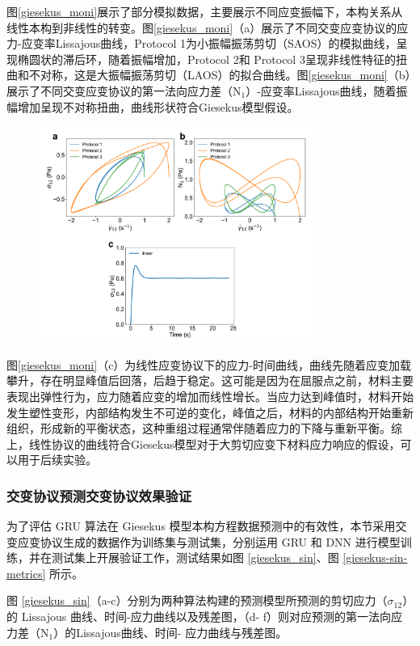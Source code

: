 图\ref{giesekus_moni}展示了部分模拟数据，主要展示不同应变振幅下，本构关系从线性本构到非线性的转变。图\ref{giesekus_moni}（a）展示了不同交变应变协议的应力-应变率Lissajous曲线，Protocol 1为小振幅振荡剪切（SAOS）的模拟曲线，呈现椭圆状的滞后环，随着振幅增加，Protocol 2和 Protocol 3呈现非线性特征的扭曲和不对称，这是大振幅振荡剪切（LAOS）的拟合曲线。图\ref{giesekus_moni}（b）展示了不同交变应变协议的第一法向应力差（N$_1$）-应变率Lissajous曲线，随着振幅增加呈现不对称扭曲，曲线形状符合Giesekus模型假设\cite{lennonScientificMachineLearning2023a}。
\begin{figure}[htbp]
  \centering
  \includegraphics[width=0.8\textwidth]{Fig/giesekus-moni.pdf}
  \FigureBicaption{\label{giesekus_moni}}{}
\end{figure}
图\ref{giesekus_moni}（c）为线性应变协议下的应力-时间曲线，曲线先随着应变加载攀升，存在明显峰值后回落，后趋于稳定。这可能是因为在屈服点之前，材料主要表现出弹性行为，应力随着应变的增加而线性增长。当应力达到峰值时，材料开始发生塑性变形，内部结构发生不可逆的变化，峰值之后，材料的内部结构开始重新组织，形成新的平衡状态，这种重组过程通常伴随着应力的下降与重新平衡。综上，线性协议的曲线符合Giesekus模型对于大剪切应变下材料应力响应的假设，可以用于后续实验。

\subsubsection{交变协议预测交变协议效果验证}
为了评估 GRU 算法在 Giesekus 模型本构方程数据预测中的有效性，本节采用交变应变协议生成的数据作为训练集与测试集，分别运用 GRU 和 DNN 进行模型训练，并在测试集上开展验证工作，测试结果如图 \ref{giesekus_sin}、图 \ref{giesekus-sin-metrics} 所示。

图 \ref{giesekus_sin}（a-c）分别为两种算法构建的预测模型所预测的剪切应力（$\sigma_{12}$）的 Lissajous 曲线、时间-应力曲线以及残差图，（d- f）则对应预测的第一法向应力差（N$_{1}$）的Lissajous曲线、时间- 应力曲线与残差图。

